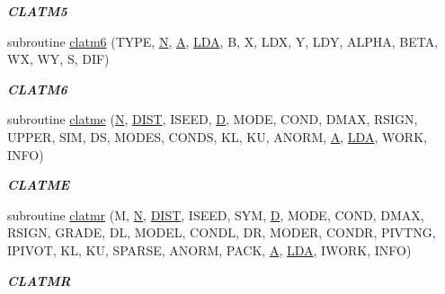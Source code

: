\begin{DoxyCompactItemize}
\begin{DoxyCompactList}\small\item\em {\bfseries C\+L\+A\+T\+M5} \end{DoxyCompactList}\item 
subroutine \hyperlink{group__complex__matgen_gae9d75b31c19f718d006ac8059071b253}{clatm6} (T\+Y\+P\+E, \hyperlink{polmisc_8c_a0240ac851181b84ac374872dc5434ee4}{N}, \hyperlink{classA}{A}, \hyperlink{example__user_8c_ae946da542ce0db94dced19b2ecefd1aa}{L\+D\+A}, B, X, L\+D\+X, Y, L\+D\+Y, A\+L\+P\+H\+A, B\+E\+T\+A, W\+X, W\+Y, S, D\+I\+F)
\begin{DoxyCompactList}\small\item\em {\bfseries C\+L\+A\+T\+M6} \end{DoxyCompactList}\item 
subroutine \hyperlink{group__complex__matgen_ga6b623095dea5337d8a8cc4e32c7990e0}{clatme} (\hyperlink{polmisc_8c_a0240ac851181b84ac374872dc5434ee4}{N}, \hyperlink{superlu__enum__consts_8h_af00a42ecad444bbda75cde1b64bd7e72ac04fbbdf0d80a4ad25e565541deeebd7}{D\+I\+S\+T}, I\+S\+E\+E\+D, \hyperlink{odrpack_8h_a7dae6ea403d00f3687f24a874e67d139}{D}, M\+O\+D\+E, C\+O\+N\+D, D\+M\+A\+X, R\+S\+I\+G\+N, U\+P\+P\+E\+R, S\+I\+M, D\+S, M\+O\+D\+E\+S, C\+O\+N\+D\+S, K\+L, K\+U, A\+N\+O\+R\+M, \hyperlink{classA}{A}, \hyperlink{example__user_8c_ae946da542ce0db94dced19b2ecefd1aa}{L\+D\+A}, W\+O\+R\+K, I\+N\+F\+O)
\begin{DoxyCompactList}\small\item\em {\bfseries C\+L\+A\+T\+M\+E} \end{DoxyCompactList}\item 
subroutine \hyperlink{group__complex__matgen_ga965cf56889238ff917eba10e6dbea93e}{clatmr} (M, \hyperlink{polmisc_8c_a0240ac851181b84ac374872dc5434ee4}{N}, \hyperlink{superlu__enum__consts_8h_af00a42ecad444bbda75cde1b64bd7e72ac04fbbdf0d80a4ad25e565541deeebd7}{D\+I\+S\+T}, I\+S\+E\+E\+D, S\+Y\+M, \hyperlink{odrpack_8h_a7dae6ea403d00f3687f24a874e67d139}{D}, M\+O\+D\+E, C\+O\+N\+D, D\+M\+A\+X, R\+S\+I\+G\+N, G\+R\+A\+D\+E, D\+L, M\+O\+D\+E\+L, C\+O\+N\+D\+L, D\+R, M\+O\+D\+E\+R, C\+O\+N\+D\+R, P\+I\+V\+T\+N\+G, I\+P\+I\+V\+O\+T, K\+L, K\+U, S\+P\+A\+R\+S\+E, A\+N\+O\+R\+M, P\+A\+C\+K, \hyperlink{classA}{A}, \hyperlink{example__user_8c_ae946da542ce0db94dced19b2ecefd1aa}{L\+D\+A}, I\+W\+O\+R\+K, I\+N\+F\+O)
\begin{DoxyCompactList}\small\item\em {\bfseries C\+L\+A\+T\+M\+R} \end{DoxyCompactList}\item 

\end{DoxyCompactItemize}
